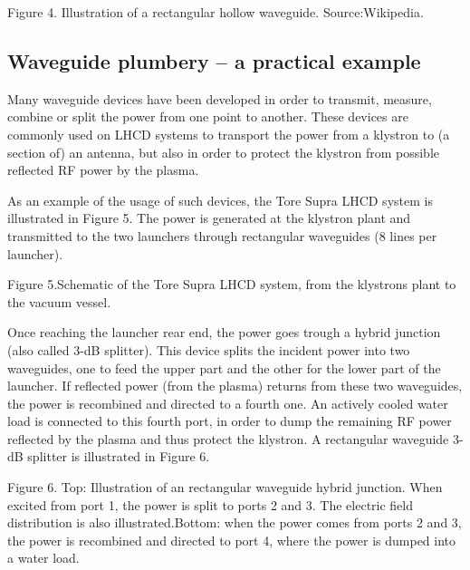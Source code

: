 Figure 4. Illustration of a rectangular hollow waveguide. Source:Wikipedia.

\subsection{Waveguide plumbery – a practical example}
Many waveguide devices have been developed in order to transmit, measure, combine or split the power from one point to another. These devices are commonly used on LHCD systems to transport the power from a klystron to (a section of) an antenna, but also in order to protect the klystron from possible reflected RF power by the plasma.   

As an example of the usage of such devices, the Tore Supra LHCD system is illustrated in Figure 5. The power is generated at the klystron plant and transmitted to the two launchers through rectangular waveguides (8 lines per launcher). 


Figure 5.Schematic of the Tore Supra LHCD system, from the klystrons plant to the vacuum vessel. 

Once reaching the launcher rear end, the power goes trough a hybrid junction (also called 3-dB splitter). This device splits the incident power into two waveguides, one to feed the upper part and the other for the lower part of the launcher.  If reflected power (from the plasma) returns from these two waveguides, the power is recombined and directed to a fourth one. An actively cooled water load is connected to this fourth port, in order to dump the remaining RF power reflected by the plasma and thus protect the klystron. A rectangular waveguide 3-dB splitter is illustrated in Figure 6. 

Figure 6. Top: Illustration of an rectangular waveguide hybrid junction. When excited from port 1, the power is split to ports 2 and 3. The electric field distribution is also illustrated.Bottom: when the power comes from ports 2 and 3, the power is recombined and directed to port 4, where the power is dumped into a water load. 

